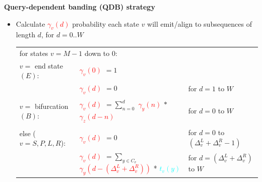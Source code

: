 \documentclass[landscape]{slides}
\begin{document}
\begin{slide}
\begin{center}
\textbf{Query-dependent banding (QDB) strategy}
\end{center}

\tiny
\begin{itemize}
\item
Calculate \textcolor{red}{$\gamma_v(d)$} probability each state $v$ will emit/align to
subsequences of length $d$, for $d = 0..W$

\begin{tabular}{l|l|l}
\multicolumn{3}{l}{for states $v = M-1$ down to $0$:} \\
$v = $ end state $(E)$: & \textcolor{red}{$\gamma_v(0)$} $= 1$ & \\
                        & \textcolor{red}{$\gamma_v(d)$} $= 0$ & for $d=1$ to $W$ \\
& & \\
$v = $ bifurcation $(B)$: & \textcolor{red}{$\gamma_v(d)$} $= \sum_{n=0}^{d}$ \textcolor{red}{$\gamma_y(n)$}
$*$ \textcolor{red}{$\gamma_z(d-n)$} & for $d = 0$ to $W$ \\
& & \\
else ($v = S, P, L, R$): & \textcolor{red}{$\gamma_v(d)$} $= 0$ & for $d=0$ to $(\Delta_v^{L} + \Delta_v^{R} -
1)$ \\
& \textcolor{red}{$\gamma_v(d)$} $= \sum_{y \in C_v}$ \textcolor{red}{$\gamma_y(d-(\Delta_v^{L} + \Delta_v^{R}))$} * \textcolor{cyan}{$t_v(y)$}
& for $d = (\Delta_v^{L} + \Delta_v^{R})$ to $W$ \\
\end{tabular}

\end{itemize}

\vfill
\end{slide}
\end{document}
